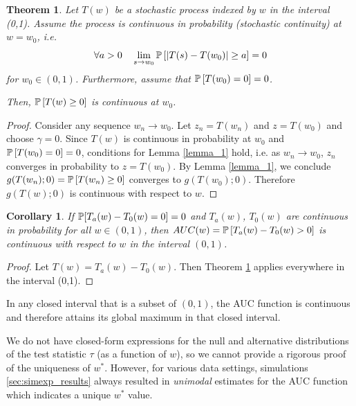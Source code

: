 \documentclass[12pt,oneside,final]{thesis}
\newtheorem{thm}{Theorem}
\newtheorem{cor}{Corollary}
\begin{document}
\begin{thm} \label{main_thm}
Let $T(w)$ be  a stochastic process indexed by $w$ in the interval (0,1). Assume  the process is continuous in probability  (stochastic continuity)   at $w=w_0$,  i.e.
\begin{equation} \forall a>0 \quad  \lim_{s \rightarrow w_0} \mathbb{P}\left[\left|T(s)-T(w_0) \right| \geq a \right] = 0 
\end{equation}
for $ w_0\in (0,1)$. Furthermore, assume that $\mathbb{P}\left[T(w_0)=0\right]=0$.

Then, $\mathbb{P} \left[ T(w) \geq 0\right]$ is continuous at $w_0$.
\end{thm}

\begin{proof}
Consider any sequence $w_n \rightarrow w_0$. Let $z_n = T(w_n)$ and  $z=T(w_0)$ and choose $\gamma=0$. Since $T(w)$ is continuous in probability at $w_0$ and $\mathbb{P}\left[T(w_0)=0\right]=0$, conditions for Lemma \ref{lemma_1} hold, i.e. \hspace{-.5em} as $w_n\rightarrow w_0$, $z_n$ converges in probability to $z=T(w_0)$. By  Lemma \ref{lemma_1}, we conclude  $g(T(w_n); 0 ) = \mathbb{P} \left[ T(w_n) \geq 0\right]$ converges to $g(T(w_0);0)$. Therefore $g(T(w);0)$ is continuous with respect to $w$.
\end{proof}


\begin{cor}{
 If $\mathbb{P}[T_a(w)-T_0(w)=0]=0$ and $T_a(w)$, $T_0(w)$ are continuous in probability for all $w \in (0,1)$, then $AUC(w)=\mathbb{P}\left[T_a(w)-T_0(w) >0 \right]$ is continuous with respect to $w$  in the interval $(0,1)$.}
\end{cor}
\begin{proof}

Let $T(w)=T_a(w)-T_0(w).$ Then Theorem \ref{main_thm} applies everywhere in the interval (0,1).
\end{proof}

In any closed interval that is a subset of $(0,1)$, the AUC function is continuous and therefore attains its global maximum in that closed interval.

 We do not have closed-form expressions for the null and alternative distributions of the test statistic $\tau$ (as a function of  $w$), so we cannot provide a rigorous proof of the uniqueness of $w^*$. However, for various data settings, simulations \ref{sec:simexp_results} always resulted in \emph{unimodal}  estimates for the AUC function which indicates a unique $w^*$ value.
\end{document}
